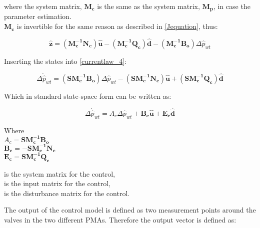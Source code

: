 where the system matrix, $\bm{M_c}$ is the same as the system matrix, $\bm{M_p}$, in case the parameter estimation. 
\\
$\bm{M_c}$ is invertible for the same reason as described in \eqref{Jequation}, thus:

 \begin{equation}
 \bm{\hat{z}} =  (\bm{M_c^{-1}}\bm{N_c}) \bm{\hat{u}} - (\bm{M_c^{-1}}\bm{Q_c}) \bm{\hat{d}} - (\bm{M_c^{-1}}\bm{B_o}) \Delta \hat{p}_{wt}    
 \label{statespace_control_sys_state}
\end{equation}

Inserting the states into \eqref{currentlaw_4}:

 \begin{equation}
\Delta \dot{\hat{p}}_{wt} = (\bm{S}\bm{M_c^{-1}}\bm{B_o}) \Delta \hat{p}_{wt}  - (\bm{S}\bm{M_c^{-1}}\bm{N_c}) \bm{\hat{u}} + (\bm{S}\bm{M_c^{-1}}\bm{Q_c}) \bm{\hat{d}} 
 \label{statespace_control_sys_state_1}
\end{equation}

Which in standard state-space form can be written as: 

 \begin{equation}
\Delta \dot{\hat{p}}_{wt} = A_c \Delta \hat{p}_{wt}  + \bm{B_c} \bm{\hat{u}} + \bm{E_c} \bm{\hat{d}} 
 \label{statespace_control_sys_state_2}
\end{equation}

\begin{minipage}[t]{0.40\textwidth}
Where\\
\hspace*{8mm} $A_c = \bm{S}\bm{M_c^{-1}}\bm{B_o} $ \\
\hspace*{8mm} $\bm{B_c} = -\bm{S}\bm{M_c^{-1}}\bm{N_c} $ \\
\hspace*{8mm} $\bm{E_c} = \bm{S}\bm{M_c^{-1}}\bm{Q_c} $
\end{minipage}
\begin{minipage}[t]{0.48\textwidth}
\vspace*{1mm}
is the system matrix for the control, \\
is the input matrix for the control, \\
is the disturbance matrix for the control.
\end{minipage} 

The output of the control model is defined as two measurement points around the valves in the two different PMAs. Therefore the output vector is defined as: 

